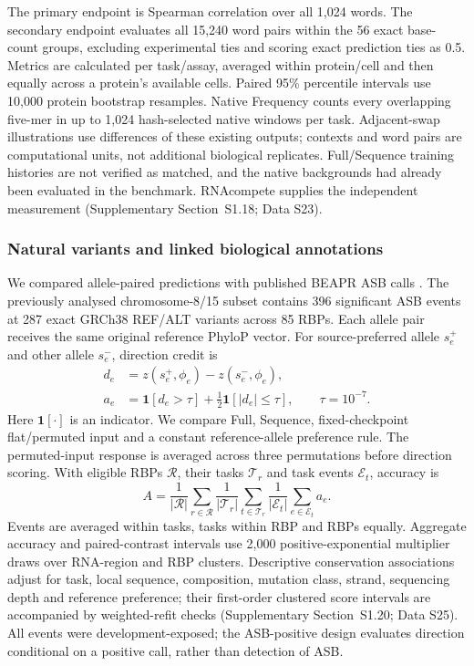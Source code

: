 \documentclass[webpdf,contemporary,large]{oup-authoring-template}
\newcommand{\supsect}[1]{Supplementary Section~#1}
\begin{document}
The primary endpoint is Spearman correlation over all 1,024 words. The secondary endpoint evaluates all 15,240 word pairs within the 56 exact base-count groups, excluding experimental ties and scoring exact prediction ties as 0.5. Metrics are calculated per task/assay, averaged within protein/cell and then equally across a protein's available cells. Paired 95\% percentile intervals use 10,000 protein bootstrap resamples. Native Frequency counts every overlapping five-mer in up to 1,024 hash-selected native windows per task. Adjacent-swap illustrations use differences of these existing outputs; contexts and word pairs are computational units, not additional biological replicates. Full/Sequence training histories are not verified as matched, and the native backgrounds had already been evaluated in the benchmark. RNAcompete supplies the independent measurement (\supsect{S1.18}; Data S23).

\subsubsection{Natural variants and linked biological annotations}\label{subsec:variant_methods}

We compared allele-paired predictions with published BEAPR ASB calls \citep{yang2019asb}. The previously analysed chromosome-8/15 subset contains 396 significant ASB events at 287 exact GRCh38 REF/ALT variants across 85 RBPs. Each allele pair receives the same original reference PhyloP vector. For source-preferred allele $s_e^+$ and other allele $s_e^-$, direction credit is
\begin{equation}
\begin{aligned}
d_e&=z(s_e^+,\phi_e)-z(s_e^-,\phi_e),\\
a_e&=\mathbf1[d_e>\tau]
+\tfrac12\mathbf1[|d_e|\leq\tau],
\qquad \tau=10^{-7}.
\end{aligned}
\label{eq:allele_direction}
\end{equation}
Here $\mathbf1[\cdot]$ is an indicator. We compare Full, Sequence, fixed-checkpoint flat/permuted input and a constant reference-allele preference rule. The permuted-input response is averaged across three permutations before direction scoring. With eligible RBPs $\mathcal R$, their tasks $\mathcal T_r$ and task events $\mathcal E_t$, accuracy is
\begin{equation}
A=\frac1{|\mathcal R|}\sum_{r\in\mathcal R}
\frac1{|\mathcal T_r|}\sum_{t\in\mathcal T_r}
\frac1{|\mathcal E_t|}\sum_{e\in\mathcal E_t}a_e.
\label{eq:allele_accuracy}
\end{equation}
Events are averaged within tasks, tasks within RBP and RBPs equally. Aggregate accuracy and paired-contrast intervals use 2,000 positive-exponential multiplier draws over RNA-region and RBP clusters. Descriptive conservation associations adjust for task, local sequence, composition, mutation class, strand, sequencing depth and reference preference; their first-order clustered score intervals are accompanied by weighted-refit checks (\supsect{S1.20}; Data S25). All events were development-exposed; the ASB-positive design evaluates direction conditional on a positive call, rather than detection of ASB.
\end{document}
